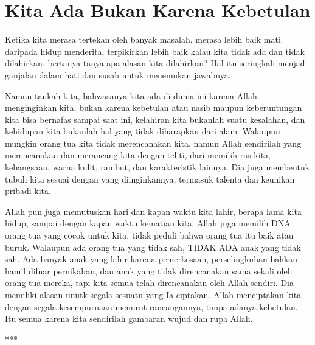 \section*{Kita Ada Bukan Karena Kebetulan}

Ketika kita merasa tertekan oleh banyak masalah, merasa lebih baik mati daripada hidup menderita, terpikirkan lebih baik kalau kita tidak ada dan tidak dilahirkan. bertanya-tanya apa alasan kita dilahirkan? Hal itu seringkali menjadi ganjalan dalam hati dan susah untuk menemukan jawabnya.

Namun taukah kita, bahwasanya kita ada di dunia ini karena Allah menginginkan kita, bukan karena kebetulan atau nasib maupun keberuntungan kita bisa bernafas sampai saat ini, kelahiran kita bukanlah suatu kesalahan, dan kehidupan kita bukanlah hal yang tidak diharapkan dari alam.
Walaupun mungkin orang tua kita tidak merencanakan kita, namun Allah sendirilah yang merencanakan dan merancang kita dengan teliti, dari memilih ras kita, kebangsaan, warna kulit, rambut, dan karakteristik lainnya. Dia juga membentuk tubuh kita sesuai dengan yang diinginkannya, termasuk talenta dan keunikan pribadi kita.

Allah pun juga memutuskan hari dan kapan waktu kita lahir, berapa lama kita hidup, sampai dengan kapan waktu kematian kita. Allah juga memilih DNA orang tua yang cocok untuk kita, tidak peduli bahwa orang tua itu baik atau buruk. Walaupun ada orang tua yang tidak sah, TIDAK ADA anak yang tidak sah. Ada banyak anak yang lahir karena pemerkosaan, perselingkuhan bahkan hamil diluar pernikahan, dan anak yang tidak direncanakan sama sekali oleh orang tua mereka, tapi kita semua telah direncanakan oleh Allah sendiri.
Dia memiliki alasan unutk segala sesuatu yang Ia ciptakan. Allah menciptakan kita dengan segala kesempurnaan menurut rancangannya, tanpa adanya kebetulan. Itu semua karena kita sendirilah gambaran wujud dan rupa Allah. 

{}
\begin{center} ***\end{center}
